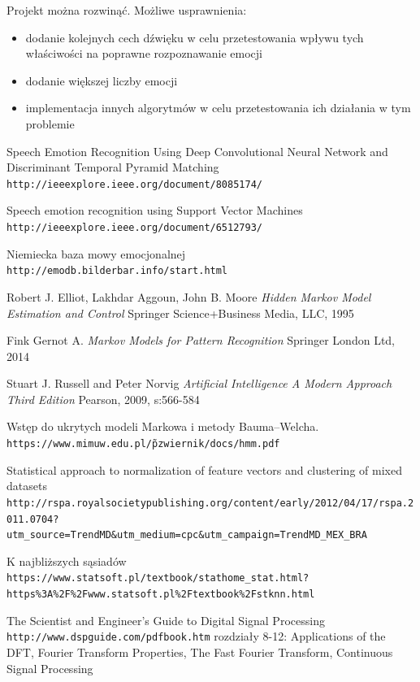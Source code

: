 \documentclass[declaration,shortabstract]{iithesis}
\begin{document}
Projekt można rozwinąć. Możliwe usprawnienia:
\begin{itemize}
\item dodanie kolejnych cech dźwięku w celu przetestowania wpływu tych właściwości na poprawne rozpoznawanie emocji
\item dodanie większej liczby emocji
\item implementacja innych algorytmów w celu przetestowania ich działania w tym problemie
\end{itemize}

\begin{thebibliography}{99}

Speech Emotion Recognition Using Deep Convolutional Neural Network and Discriminant Temporal Pyramid Matching
\\\texttt{http://ieeexplore.ieee.org/document/8085174/}

Speech emotion recognition using Support Vector Machines
\\\texttt{http://ieeexplore.ieee.org/document/6512793/}

Niemiecka baza mowy emocjonalnej
\\\texttt{http://emodb.bilderbar.info/start.html}

\bibitem{}
Robert J. Elliot, Lakhdar Aggoun, John B. Moore 
\textit{Hidden Markov Model Estimation and Control}
Springer Science+Business Media, LLC, 1995

\bibitem{}
Fink Gernot A.
\textit{Markov Models for Pattern Recognition}
Springer London Ltd, 2014

\bibitem{}
Stuart J. Russell and Peter Norvig
\textit{Artificial Intelligence A Modern Approach Third Edition}
Pearson, 2009, s:566-584

\bibitem{}
Wstęp do ukrytych modeli Markowa i metody Bauma–Welcha.
\\\texttt{https://www.mimuw.edu.pl/\~pzwiernik/docs/hmm.pdf}

\bibitem{}
Statistical approach to normalization of feature vectors and clustering of mixed datasets
\\\texttt{http://rspa.royalsocietypublishing.org/content/early/2012/04/17/rspa.2011.0704?utm\_source=TrendMD\&utm\_medium=cpc\&utm\_campaign=TrendMD\_MEX\_BRA}

\bibitem{}
K najbliższych sąsiadów
\\\texttt{https://www.statsoft.pl/textbook/stathome\_stat.html?https\%3A\%2F\%2Fwww.statsoft.pl\%2Ftextbook\%2Fstknn.html}

\bibitem{}
The Scientist and Engineer's Guide to Digital Signal Processing
\\\texttt{http://www.dspguide.com/pdfbook.htm}
rozdziały 8-12: Applications of the DFT, Fourier Transform Properties, The Fast Fourier Transform, Continuous Signal Processing

\end{thebibliography}
\end{document}
